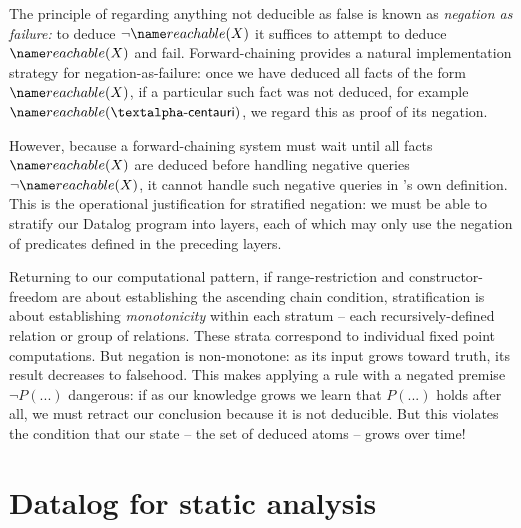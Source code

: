The principle of regarding anything not deducible as false is known as
\emph{negation as failure:} to deduce $\neg \atom{reachable}{X}$ it suffices to
attempt to deduce $\atom{reachable}{X}$ and fail.
%
Forward-chaining provides a natural implementation strategy for
negation-as-failure: once we have deduced all facts of the form
$\atom{reachable}{X}$, if a particular such fact was not deduced, for example
$\atom{reachable}{\datum{\textalpha-centauri}}$, we regard this as proof of its
negation.

However, because a forward-chaining system must wait until all facts
$\atom{reachable}{X}$ are deduced before handling negative queries
$\neg\atom{reachable}{X}$, it cannot handle such negative queries in
's own definition.
%
This is the operational justification for stratified negation: we must be able
to stratify our Datalog program into layers, each of which may only use the
negation of predicates defined in the preceding layers.

Returning to our computational pattern, if range-restriction and
constructor-freedom are about establishing the ascending chain condition,
stratification is about establishing \emph{monotonicity} within each stratum --
each recursively-defined relation or group of relations.
%
These strata correspond to individual fixed point computations.
%
But negation is non-monotone: as its input grows toward truth, its result
decreases to falsehood.
%
This makes applying a rule with a negated premise $\neg P(...)$ dangerous: if as
our knowledge grows we learn that $P(...)$ holds after all, we must retract our
conclusion because it is not deducible.
%
But this violates the condition that our state -- the set of deduced atoms -- grows over time!




\section{Datalog for static analysis}
\label{datalog-for-static-analysis}


